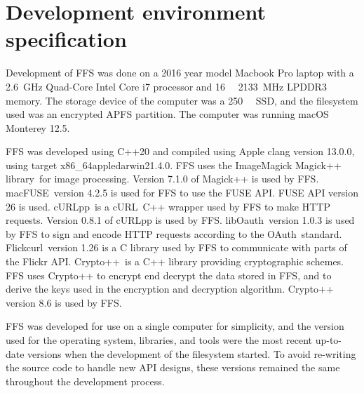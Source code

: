 \section{Development environment specification}
\label{sec:dev_env}
Development of \gls{FFS} was done on a 2016 year model Macbook Pro laptop with a \SI{2.6}{\giga\hertz} Quad-Core Intel Core i7 processor and \SI{16}{\giga\byte} \SI{2133}{\mega\hertz} LPDDR3 memory. The storage device of the computer was a \SI{250}{\giga\byte} \gls{SSD}, and the filesystem used was an encrypted \gls{APFS} partition. The computer was running macOS Monterey 12.5.

FFS was developed using C++20 and compiled using Apple clang version 13.0.0, using target x86\_64\-apple\-darwin21.4.0. \gls{FFS} uses the ImageMagick Magick++ library\,\cite{ImageMagick2022} for image processing. Version 7.1.0 of Magick++ is used by \gls{FFS}. macFUSE\,\cite{HomeMacFUSE} version 4.2.5 is used for \gls{FFS} to use the \gls{FUSE} API. \gls{FUSE} API version 26 is used. cURLpp\,\cite{barrette-lapierreCURLpp2022} is a cURL\,\cite{CurlCurl2022} C++ wrapper used by \gls{FFS} to make HTTP requests. Version 0.8.1 of cURLpp is used by \gls{FFS}. libOauth\,\cite{Liboauth} version 1.0.3 is used by \gls{FFS} to sign and encode HTTP requests according to the OAuth\,\cite{barrette-lapierreCURLpp2022} standard. Flickcurl\,\cite{beckettFlickcurlLibraryFlickr} version 1.26 is a C library used by \gls{FFS} to communicate with parts of the Flickr API. Crypto++\,\cite{CryptoLibraryFree} is a C++ library providing cryptographic schemes. \gls{FFS} uses Crypto++ to encrypt end decrypt the data stored in \gls{FFS}, and to derive the keys used in the encryption and decryption algorithm. Crypto++ version 8.6 is used by \gls{FFS}.

FFS was developed for use on a single computer for simplicity, and the version used for the operating system, libraries, and tools were the most recent up-to-date versions when the development of the filesystem started. To avoid re-writing the source code to handle new API designs, these versions remained the same throughout the development process.